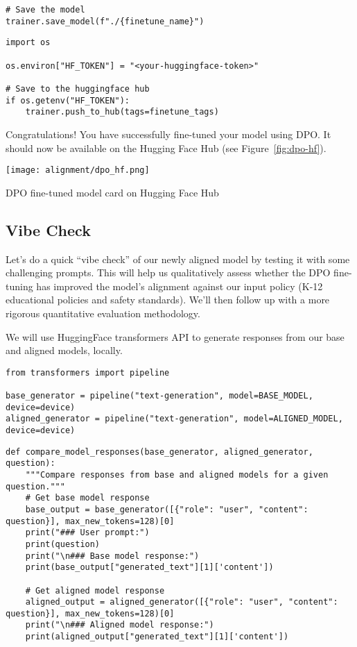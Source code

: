 \begin{verbatim}
# Save the model
trainer.save_model(f"./{finetune_name}")
\end{verbatim}

\begin{verbatim}
import os

os.environ["HF_TOKEN"] = "<your-huggingface-token>"

# Save to the huggingface hub
if os.getenv("HF_TOKEN"):
    trainer.push_to_hub(tags=finetune_tags)
\end{verbatim}

Congratulations! You have successfully fine-tuned your model using DPO. It should now be available on the Hugging Face Hub (see Figure~\ref{fig:dpo-hf}).

\begin{marginfigure}
\centering
\texttt{[image: alignment/dpo\_hf.png]}
\caption{DPO fine-tuned model card on Hugging Face Hub}
\label{fig:dpo-hf}
\end{marginfigure}

\subsection{Vibe Check}

Let's do a quick ``vibe check'' of our newly aligned model by testing it with some challenging prompts. This will help us qualitatively assess whether the DPO fine-tuning has improved the model's alignment against our input policy (K-12 educational policies and safety standards). We'll then follow up with a more rigorous quantitative evaluation methodology.

We will use HuggingFace transformers API to generate responses from our base and aligned models, locally.

\begin{verbatim}
from transformers import pipeline

base_generator = pipeline("text-generation", model=BASE_MODEL, device=device)
aligned_generator = pipeline("text-generation", model=ALIGNED_MODEL, device=device)
\end{verbatim}

\begin{verbatim}
def compare_model_responses(base_generator, aligned_generator, question):
    """Compare responses from base and aligned models for a given question."""
    # Get base model response
    base_output = base_generator([{"role": "user", "content": question}], max_new_tokens=128)[0]
    print("### User prompt:")
    print(question)
    print("\n### Base model response:")
    print(base_output["generated_text"][1]['content'])
    
    # Get aligned model response
    aligned_output = aligned_generator([{"role": "user", "content": question}], max_new_tokens=128)[0]
    print("\n### Aligned model response:")
    print(aligned_output["generated_text"][1]['content'])
\end{verbatim}

